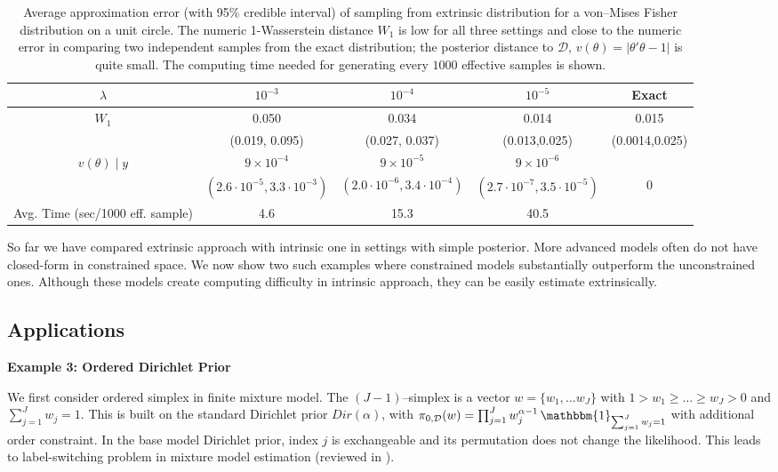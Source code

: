 \documentclass[10pt]{article}
\newcommand{\mc}[1]{\mathcal{#1}}
\DeclareMathOperator{\1}{\mathbbm{1}}
\begin{document}
\begin{table}[H]
\label{tbUnitCircle}
\centering
\small
\begin{tabular}{ c| c | c| c | c}
  \hline			
  $\lambda$  &  $10^{-3}$ & $10^{-4}$ & $10^{-5}$ & Exact  \\
  \hline
  \hline
  $W_1$ & 0.050 & 0.034  & 0.014   & 0.015 \\
  
   &  (0.019, 0.095) &(0.027, 0.037) &  (0.013,0.025)  & (0.0014,0.025)\\
  
  \hline
  $v(\theta) \mid y$ 
  & $9\times 10^{-4} $ 
  & $9\times 10^{-5} $ 
  & $9\times 10^{-6} $ \\
  & $(2.6 \cdot 10^{-5}, 3.3\cdot 10^{-3})$& $(2.0 \cdot 10^{-6}, 3.4\cdot 10^{-4})$& $(2.7 \cdot 10^{-7}, 3.5\cdot 10^{-5})$& 0\\
  \hline
  Avg. Time (sec/1000 eff. sample) & 4.6 & 15.3 & 40.5 &    \\
  \hline  
\end{tabular}
\caption{Average approximation error (with 95\% credible interval) of sampling from extrinsic distribution for 
a von--Mises Fisher distribution on a unit circle. The numeric 1-Wasserstein distance $W_1$ is low for all three settings and close to the numeric error in comparing two independent samples from the exact distribution; the posterior distance to $\mc D$, $v(\theta)= |\theta'\theta-1|$ is quite small.  The computing time needed for generating every $1000$ effective samples is shown.}
\end{table}

So far we have compared extrinsic approach with intrinsic one in settings with simple posterior. More advanced models often do not have closed-form in constrained space. We now show two such examples where constrained models substantially outperform the unconstrained ones. Although these models create computing difficulty in intrinsic approach, they can be easily estimate extrinsically.


\subsection{Applications}

{\bf Example 3: Ordered Dirichlet Prior}

We first consider ordered simplex in finite mixture model. The $(J-1)$--simplex is a vector $w=\{w_1,\ldots w_J\}$ with $1> w_1 \ge \ldots \ge w_J > 0$ and $\sum_{j=1}^J w_j=1$. This is built on the standard Dirichlet prior $Dir(\alpha)$, with $
\pi_{0, \mc D}(w) = \prod_{j=1}^J w_j^{\alpha-1} \1_{\sum_{j=1}^J w_j=1}$ with additional order constraint. In the base model Dirichlet prior,  index $j$ is exchangeable and its permutation does not change the likelihood. This leads to label-switching problem in mixture model estimation (reviewed in \cite{jasra2005markov}).
\end{document}
